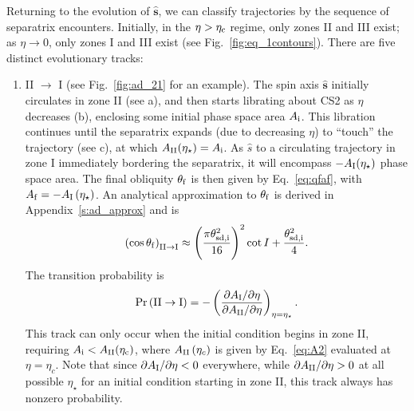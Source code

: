 \documentclass[
        fleqn,
        usenatbib,
    ]{mnras}
\newcommand*{\pdil}[2]{\partial#1 / \partial#2}
\newcommand*{\bm}[1]{\boldsymbol{\mathbf{#1}}}
\newcommand*{\uv}[1]{\hat{\bm{#1}}}
\newcommand*{\p}[1]{\left(#1\right)}
\begin{document}
Returning to the evolution of $\uv{s}$, we can classify trajectories by the
sequence of separatrix encounters. Initially, in the $\eta > \eta_{\rm c}$
regime, only zones II and III exist; as $\eta \to 0$, only zones I and III exist
(see Fig.~\ref{fig:eq_1contours}). There are five distinct evolutionary tracks:
\begin{enumerate}
    \item II $\to$ I (see Fig.~\ref{fig:ad_21} for an example). The spin axis
        $\uv{s}$ initially circulates in zone II (see a), and then starts
        librating about CS2 as $\eta$ decreases (b), enclosing some initial
        phase space area $A_{\rm i}$. This libration continues until the
        separatrix expands (due to decreasing $\eta$) to ``touch'' the
        trajectory (see c), at which $A_{\rm II}(\eta_\star) = A_{\rm i}$.
        As $\hat{s}$ to a
        circulating trajectory in zone I immediately bordering the separatrix,
        it will encompass $-A_{\rm I}(\eta_\star)$ phase space area. The final
        obliquity $\theta_{\rm f}$ is then given by Eq.~\eqref{eq:qfaf}, with
        $A_{\rm f} = -A_{\rm I}\p{\eta_\star}$. An analytical approximation to
        $\theta_{\rm f}$ is derived in Appendix~\ref{s:ad_approx} and is
        \begin{equation}
            \p{\cos \theta_{\rm f}}_{\rm II \to I} \approx
                \p{\frac{\pi \theta_{\rm sd, i}^2}{16}}^2 \cot I
                    + \frac{\theta_{\rm sd, i}^2}{4}.\label{eq:qf_21_approx}
        \end{equation}
        The transition probability is
        \begin{equation}
            \Pr\p{\mathrm{II} \to \mathrm{I}} = -\p{
                \frac{\pdil{A_{\rm I}}{\eta}}{\pdil{A_{\rm II}}{\eta}}}
                    _{\eta = \eta_{\star}}.
        \end{equation}
        This track can only occur when the initial condition begins in zone II,
        requiring $A_{\rm i} < A_{\rm II}(\eta_{\rm c})$, where $A_{\rm
        II}\p{\eta_c}$ is given by Eq.~\eqref{eq:A2} evaluated at $\eta =
        \eta_c$. Note that since $\pdil{A_{\rm I}}{\eta} < 0$ everywhere, while
        $\pdil{A_{\rm II}}{\eta} > 0$ at all possible $\eta_\star$ for an
        initial condition starting in zone II, this track always has nonzero
        probability.


\end{enumerate}
\end{document}
